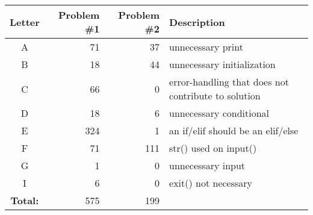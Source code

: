 \vspace{2em}
\small
\begin{supertabular}{crrp{.5\textwidth}}
\label{labelsC}
Letter & Problem \#1 & Problem \#2 & Description \\ 
\toprule
A & 71 & 37 & unnecessary print \\
B & 18 & 44 & unnecessary initialization \\
C & 66 & 0 & error-handling that does not contribute to solution \\
D & 18 & 6 & unnecessary conditional \\
E & 324 & 1 & an if/elif should be an elif/else \\
F & 71 & 111 & str() used on input() \\
G & 1 & 0 & unnecessary input \\
I & 6 & 0 & exit() not necessary \\

\bottomrule
\textbf{Total:} & 575 & 199 & \\
\end{supertabular}
\vspace{2em}